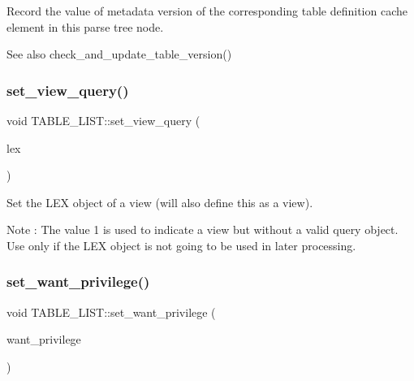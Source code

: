 Record the value of metadata version of the corresponding table definition cache element in this parse tree node.

\begin{DoxySeeAlso}{See also}
check\+\_\+and\+\_\+update\+\_\+table\+\_\+version() 
\end{DoxySeeAlso}
\mbox{\label{structTABLE__LIST_a6878f08fcc39c50e04482b6e0856745f}} 
\subsubsection{\texorpdfstring{set\+\_\+view\+\_\+query()}{set\_view\_query()}}
{\footnotesize\ttfamily void T\+A\+B\+L\+E\+\_\+\+L\+I\+S\+T\+::set\+\_\+view\+\_\+query (\begin{DoxyParamCaption}\item[{L\+EX $\ast$}]{lex }\end{DoxyParamCaption})\hspace{0.3cm}{\ttfamily [inline]}}

Set the L\+EX object of a view (will also define this as a view). \begin{DoxyNote}{Note}
\+: The value 1 is used to indicate a view but without a valid query object. Use only if the L\+EX object is not going to be used in later processing. 
\end{DoxyNote}
\mbox{\label{structTABLE__LIST_af0d0bba1cc8b85fbbbe7bd1ea54e8e7e}} 
\subsubsection{\texorpdfstring{set\+\_\+want\+\_\+privilege()}{set\_want\_privilege()}}
{\footnotesize\ttfamily void T\+A\+B\+L\+E\+\_\+\+L\+I\+S\+T\+::set\+\_\+want\+\_\+privilege (\begin{DoxyParamCaption}\item[{ulong}]{want\+\_\+privilege }\end{DoxyParamCaption})}



